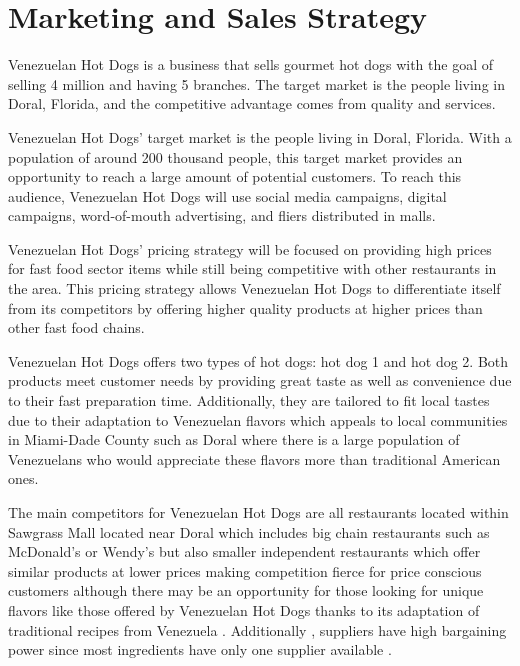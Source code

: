 

\section{Marketing and Sales Strategy}\label{sec:marketing_sales}
Venezuelan Hot Dogs is a business that sells gourmet hot dogs with the goal of selling 4 million and having 5 branches. The target market is the people living in Doral, Florida, and the competitive advantage comes from quality and services. 

 Venezuelan Hot Dogs' target market is the people living in Doral, Florida. With a population of around 200 thousand people, this target market provides an opportunity to reach a large amount of potential customers. To reach this audience, Venezuelan Hot Dogs will use social media campaigns, digital campaigns, word-of-mouth advertising, and fliers distributed in malls. 

 Venezuelan Hot Dogs' pricing strategy will be focused on providing high prices for fast food sector items while still being competitive with other restaurants in the area. This pricing strategy allows Venezuelan Hot Dogs to differentiate itself from its competitors by offering higher quality products at higher prices than other fast food chains. 

 Venezuelan Hot Dogs offers two types of hot dogs: hot dog 1 and hot dog 2. Both products meet customer needs by providing great taste as well as convenience due to their fast preparation time. Additionally, they are tailored to fit local tastes due to their adaptation to Venezuelan flavors which appeals to local communities in Miami-Dade County such as Doral where there is a large population of Venezuelans who would appreciate these flavors more than traditional American ones.  

  The main competitors for Venezuelan Hot Dogs are all restaurants located within Sawgrass Mall located near Doral which includes big chain restaurants such as McDonald's or Wendy's but also smaller independent restaurants which offer similar products at lower prices making competition fierce for price conscious customers although there may be an opportunity for those looking for unique flavors like those offered by Venezuelan Hot Dogs thanks to its adaptation of traditional recipes from Venezuela . Additionally , suppliers have high bargaining power since most ingredients have only one supplier available . 

